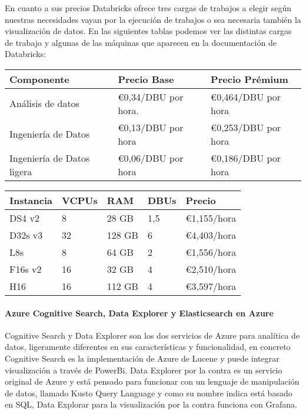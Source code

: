 \documentclass[11pt, a4paper]{article} %
\begin{document}
En cuanto a sus precios Databricks ofrece tres cargas de trabajos a elegir según nuestras necesidades vayan por la ejecución de trabajos o sea necesaria también la visualización de datos. En las siguientes tablas podemos ver las distintas cargas de trabajo y algunas de las máquinas que aparecen en la documentación de Databricks: \cite{docazure}
\begin{table}[htb]
  \centering
  \begin{tabular}{ | P{3cm} | P{3cm} | P{3cm} |}
    \hline
    Componente & Precio Base & Precio Prémium \\ \hline
    Análisis de datos & €0,34/DBU por hora.  & €0,464/DBU por hora \\ \hline
    Ingeniería de Datos & €0,13/DBU por hora & €0,253/DBU por hora \\ \hline
    Ingeniería de Datos ligera & €0,06/DBU por hora & €0,186/DBU por hora \\ \hline
  \end{tabular}
\end{table}
\begin{table}[htb]
  \centering
  \begin{tabular}{ | P{2cm} | P{2cm} | P{2cm} | P{2cm} | P{2cm} |}
    \hline
    Instancia & VCPUs & RAM  & DBUs & Precio\\ \hline
    DS4 v2 & 8 & 28 GB & 1,5 & €1,155/hora \\ \hline
    D32s v3	& 32 & 128 GB & 6 & €4,403/hora \\ \hline
    L8s	& 8 & 64 GB & 2 & €1,556/hora\\ \hline
    F16s v2	& 16 & 32 GB & 4 & 	€2,510/hora \\ \hline
    H16 & 16 & 112 GB & 4 & €3,597/hora \\ \hline

  \end{tabular}
\end{table}
\newpage
\paragraph{Azure Cognitive Search, Data Explorer y Elasticsearch en Azure}
Cognitive Search y Data Explorer son los dos servicios de Azure para analítica de datos, ligeramente diferentes en sus características y funcionalidad, en concreto Cognitive Search es la implementación de Azure de Lucene y puede integrar visualización a través de PowerBi. Data Explorer por la contra es un servicio original de Azure y está pensado para funcionar con un lenguaje de manipulación de datos, llamado Kusto Query Language y como su nombre indica está basado en SQL, Data Explorar para la visualización por la contra funciona con Grafana. \cite{docazure}
\end{document}
